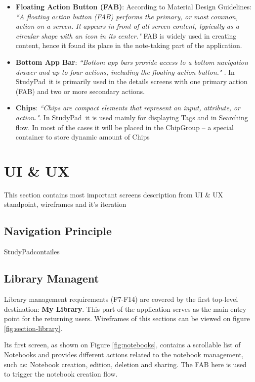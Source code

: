 \documentclass[thesis=B,english]{FITthesis}[2012/10/20]
\newcommand{\appname}{StudyPad}
\newcommand{\quoting}[1]{\textit{``#1"}}
\begin{document}
\begin{itemize}
	\item \textbf{Floating Action Button (FAB)}: According to Material Design Guidelines: \quoting{A floating action button (FAB) performs the primary, or most common, action on a screen. It appears in front of all screen content, typically as a circular shape with an icon in its center.} \cite{material-fab} FAB is widely used in creating content, hence it found its place in the note-taking part of the application.
	\item \textbf{Bottom App Bar}: \quoting{Bottom app bars provide access to a bottom navigation drawer and up to four actions, including the floating action button.} \cite{material-bottomappbar}. In \appname\ it is primarily used in the details screens with one primary action (FAB) and two or more secondary actions.
	\item \textbf{Chips}: \quoting{Chips are compact elements that represent an input, attribute, or action.}\cite{material-chips}. In \appname\ it is used mainly for displaying Tags and in Searching flow. In most of the cases it will be placed in the ChipGroup -- a special container to store dynamic amount of Chips
\end{itemize}

\section{UI \& UX}

This section contains most important screens description from UI \& UX standpoint, wireframes and it's iteration


\subsection{Navigation Principle}
\appname contailes

\subsection{Library Managent}
Library management requirements (F7-F14) are covered by the first top-level destination: \textbf{My Library}. This part of the application serves as the main entry point for the returning users. Wireframes of this sections can be viewed on figure \ref{fig:section-library}.
	
	Its first screen, as shown on Figure \ref{fig:notebooks}, contains a scrollable list of Notebooks and provides different actions related to the notebook management, such as: Notebook creation, edition, deletion and sharing. The FAB here is used to trigger the notebook creation flow. 
		
\end{document}
